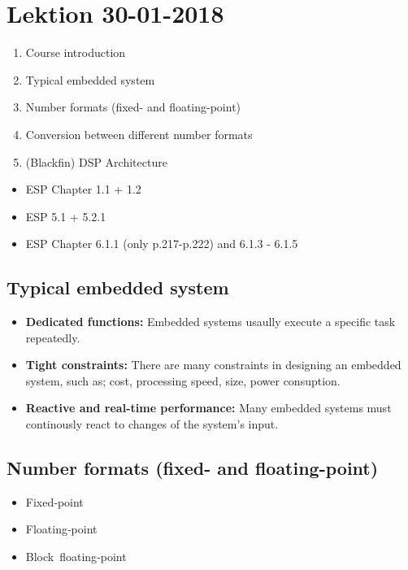 \section{Lektion 30-01-2018}

\begin{enumerate}
	\item Course introduction
	\item Typical embedded system
	\item Number formats (fixed- and floating-point)
	\item Conversion between different number formats
	\item (Blackfin) DSP Architecture
\end{enumerate}

\begin{mdframed}[style=exampledefault]
\begin{itemize}
	\item ESP Chapter 1.1 + 1.2
	\item ESP 5.1 + 5.2.1
	\item ESP Chapter 6.1.1 (only p.217-p.222) and 6.1.3 - 6.1.5
\end{itemize}
\end{mdframed}

\subsection{Typical embedded system}

\begin{itemize}
	\item \textbf{Dedicated functions:} Embedded systems usaully execute a specific task repeatedly. 
	\item \textbf{Tight constraints:} There are many constraints in designing an embedded system, such as; cost, processing speed, size, power consuption. 
	\item \textbf{Reactive and real-time performance:} Many embedded systems must continously react to changes of the system's input.
\end{itemize}

\subsection{Number formats (fixed- and floating-point)}
\begin{itemize}
	\item Fixed‐point
	\item Floating‐point
	\item Block floating‐point
\end{itemize}

